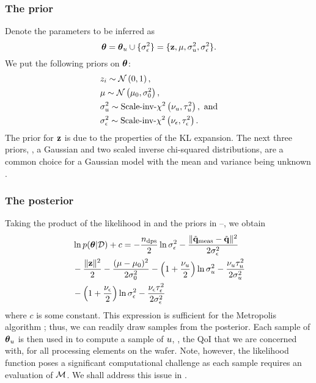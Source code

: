 \subsubsection{The prior}
Denote the parameters to be inferred as
\[
  {\boldsymbol\theta} = {\boldsymbol\theta}_u \cup \{ \sigma_\epsilon^2 \} = \{ \mathbf{z}, \mu, \sigma_u^2, \sigma_\epsilon^2 \}.
\]
We put the following priors on ${\boldsymbol\theta}$:
\begin{align}
  & \z_i \sim \gaussian{0}{1}, \elabel{z-prior} \\
  & \mu \sim \gaussian{\mu_0}{\sigma^2_0}, \elabel{mu-u-prior} \\
  & \sigma^2_\u \sim \sichisquared{\nu_\u}{\tau^2_\u}, \text{ and} \elabel{sigma2-u-prior} \\
  & \sigma^2_\noise \sim \sichisquared{\nu_\noise}{\tau^2_\noise}. \elabel{sigma2-noise-prior}
\end{align}
The prior for $\mathbf{z}$ is due to the properties of the KL expansion. The next three priors, \ie, a Gaussian and two scaled inverse chi-squared distributions, are a common choice for a Gaussian model with the mean and variance being unknown \cite{gelman2004}.

\subsubsection{The posterior}
Taking the product of the likelihood in  and the priors in --, we obtain
\begin{align}
  & \ln \f{\vparam | \Data} + c = -\frac{\ndps}{2} \ln \sigma^2_\noise - \frac{\norm{\mvT_\meas - \mvT}^2}{2 \sigma^2_\noise} \nonumber \\
  & {} - \frac{\norm{\vz}^2}{2} - \frac{(\mu - \mu_0)^2}{2 \sigma^2_0} - \left(1 + \frac{\nu_\u}{2}\right) \ln \sigma^2_\u - \frac{\nu_\u \tau_\u^2}{2 \sigma^2_\u} \nonumber \\
  & {} - \left(1 + \frac{\nu_\noise}{2}\right) \ln \sigma^2_\noise - \frac{\nu_\noise \tau_\noise^2}{2 \sigma^2_\noise} \elabel{log-posterior}
\end{align}
where $c$ is some constant. This expression is sufficient for the Metropolis algorithm \cite{gelman2004}; thus, we can readily draw samples from the posterior. Each sample of ${\boldsymbol\theta}_u$ is then used in  to compute a sample of $u$, \ie, the QoI that we are concerned with, for all processing elements on the wafer. Note, however, the likelihood function poses a significant computational challenge as each sample requires an evaluation of $\model$. We shall address this issue in .

